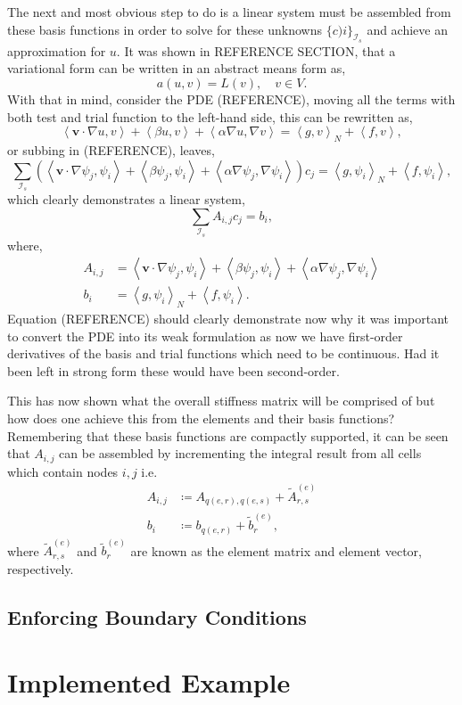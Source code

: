 The next and most obvious step to do is a linear system must be assembled from these basis functions in order to solve for these unknowns $\{c)i\}_{\mathcal{I}_s}$ and achieve an approximation for $u$. It was shown in REFERENCE SECTION, that a variational form can be written in an abstract means form as,
\begin{equation}
	a(u,v) = L(v),\quad v\in V.
\end{equation}
With that in mind, consider the PDE (REFERENCE), moving all the terms with both test and trial function to the left-hand side, this can be rewritten as,
\begin{equation}
	\left\langle\mathbf{v}\cdot\nabla u,v\right\rangle + \left\langle\beta u,v\right\rangle + \left\langle\alpha\nabla u, \nabla v\right\rangle = \left\langle g,v\right\rangle_N + \left\langle f,v\right\rangle,
\end{equation}
or subbing in (REFERENCE), leaves,
\begin{equation}
	\sum_{\mathcal{I}_s}\left(\left\langle\mathbf{v}\cdot\nabla \psi_j,\psi_i\right\rangle + \left\langle\beta \psi_j,\psi_i\right\rangle + \left\langle\alpha\nabla \psi_j, \nabla \psi_i\right\rangle\right)c_j = \left\langle g,\psi_i\right\rangle_N + \left\langle f,\psi_i\right\rangle,
\end{equation}
which clearly demonstrates a linear system,
\begin{equation}
	\sum_{\mathcal{I}_s} A_{i,j}c_j = b_i,
\end{equation}
where,
\begin{align}
	A_{i,j} &= \left\langle\mathbf{v}\cdot\nabla \psi_j,\psi_i\right\rangle + \left\langle\beta \psi_j,\psi_i\right\rangle + \left\langle\alpha\nabla \psi_j, \nabla \psi_i\right\rangle\\
	b_i &= \left\langle g,\psi_i\right\rangle_N + \left\langle f,\psi_i\right\rangle.
\end{align}
Equation (REFERENCE) should clearly demonstrate now why it was important to convert the PDE into its weak formulation as now we have first-order derivatives of the basis and trial functions which need to be continuous. Had it been left in strong form these would have been second-order.

This has now shown what the overall stiffness matrix will be comprised of but how does one achieve this from the elements and their basis functions? Remembering that these basis functions are compactly supported, it can be seen that $A_{i,j}$ can be assembled by incrementing the integral result from all cells which contain nodes $i,j$  i.e.
\begin{align}
	A_{i,j} &\coloneqq A_{q(e,r),q(e,s)} + \tilde{A}_{r,s}^{(e)}\\
	b_i &\coloneqq b_{q(e,r)} + \tilde{b}_r^{(e)},
\end{align}
where $\tilde{A}_{r,s}^{(e)}$ and $\tilde{b}_r^{(e)}$ are known as the element matrix and element vector, respectively.
\subsection{Enforcing Boundary Conditions}

\section{Implemented Example}

